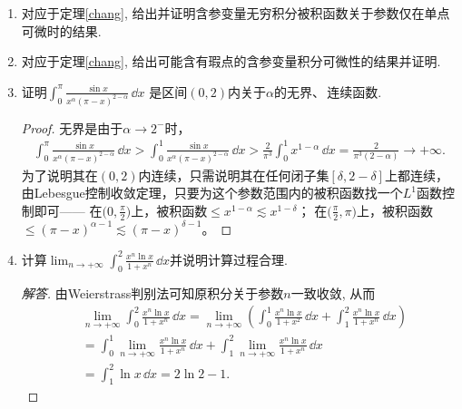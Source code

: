 \begin{a}
\begin{enumerate}
\begin{proof}[解答]
于是\[I(1)=\int_{0}^{1}I'(\alpha)\,\dd \alpha
=\int_{0}^{1}\frac{1}{1+\alpha^2}\left(\frac{\ln 2}{2}+\frac{\pi}{4}\alpha\right)\dd \alpha-I(1),\]
于是\begin{align*}I(1)&=\frac{1}{2}\int_{0}^{1}\frac{1}{1+\alpha^2}\left(\frac{\ln 2}{2}+\frac{\pi}{4}\alpha\right)\dd\alpha\\
&=\frac{1}{2}\left[\frac{\ln 2}{2}\arctan\alpha+\frac{\pi}{4}\frac{\ln(1+\alpha^2)}{2}\right]\bigg|_0^1=\frac{\pi}{8}\ln 2.\end{align*}
\end{proof}
\item 对应于定理\ref{chang}, 给出并证明含参变量无穷积分被积函数关于参数仅在单点可微时的结果.
\item 对应于定理\ref{chang}, 给出可能含有瑕点的含参变量积分可微性的结果并证明.
\item 证明\(\int_{0}^{\pi}\frac{\sin x}{x^\alpha(\pi-x)^{2-\alpha}}\,\dd x\)
是区间\((0,2)\)内关于\(\alpha\)的无界、\,连续函数.
\begin{proof}
无界是由于$\alpha\to2^-$时，
\begin{align*}
\int_{0}^{\pi}\frac{\sin x}{x^\alpha(\pi-x)^{2-\alpha}}\,\dd x
>\int_{0}^{1}\frac{\sin x}{x^\alpha(\pi-x)^{2-\alpha}}\,\dd x
>\frac{2}{\pi^3}\int_0^1x^{1-\alpha}\,\dd x=\frac{2}{\pi^3(2-\alpha)}\to+\infty.
\end{align*}
为了说明其在$(0,2)$内连续，只需说明其在任何闭子集$[\delta,2-\delta]$上都连续，
由Lebesgue控制收敛定理，只要为这个参数范围内的被积函数找一个$L^1$函数控制即可------
在$\big(0,\frac{\pi}{2}\big)$上，被积函数$\leqslant x^{1-\alpha}\lesssim x^{1-\delta}$；
在$\big(\frac{\pi}{2},\pi\big)$上，被积函数$\leqslant (\pi-x)^{\alpha-1}\lesssim (\pi-x)^{\delta-1}$。
\end{proof}
\item 计算\(\lim_{n\rightarrow+\infty}\int_{0}^{2}\frac{x^n\ln x}{1+x^n}\,\dd x\)并说明计算过程合理.
\begin{proof}[解答]
由Weierstrass判别法可知原积分关于参数\(n\)一致收敛, 从而
\[\begin{split}
&\lim_{n\rightarrow+\infty}\int_{0}^{2}\frac{x^n\ln x}{1+x^n}\,\dd x
=\lim_{n\rightarrow+\infty}\left(\int_{0}^{1}\frac{x^n\ln x}{1+x^2}\,\dd x
+\int_{1}^{2}\frac{x^n\ln x}{1+x^n}\,\dd x\right)\\
&=\int_{0}^{1}\lim_{n\rightarrow+\infty}\frac{x^n\ln x}{1+x^n}\,\dd x
+\int_{1}^{2}\lim_{n\rightarrow+\infty}\frac{x^n\ln x}{1+x^n}\,\dd x\\
&=\int_{1}^{2}\ln x\,\dd x=2\ln 2-1.
\end{split}\]

\end{proof}
\end{enumerate}
\end{a}
